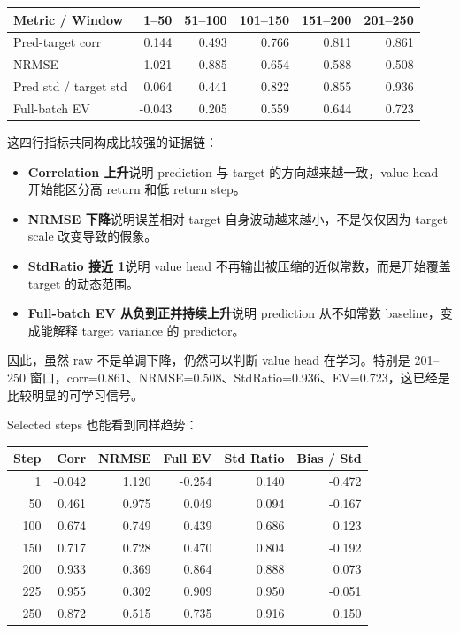\documentclass[10pt]{ctexart}
\begin{document}
\begin{center}
\begin{tabular}{lrrrrr}
\toprule
Metric / Window & 1--50 & 51--100 & 101--150 & 151--200 & 201--250 \\
\midrule
Pred-target corr & 0.144 & 0.493 & 0.766 & 0.811 & 0.861 \\
NRMSE & 1.021 & 0.885 & 0.654 & 0.588 & 0.508 \\
Pred std / target std & 0.064 & 0.441 & 0.822 & 0.855 & 0.936 \\
Full-batch EV & -0.043 & 0.205 & 0.559 & 0.644 & 0.723 \\
\bottomrule
\end{tabular}
\end{center}

这四行指标共同构成比较强的证据链：
\begin{itemize}
  \item \textbf{Correlation 上升}说明 prediction 与 target 的方向越来越一致，value head 开始能区分高 return 和低 return step。
  \item \textbf{NRMSE 下降}说明误差相对 target 自身波动越来越小，不是仅仅因为 target scale 改变导致的假象。
  \item \textbf{StdRatio 接近 1}说明 value head 不再输出被压缩的近似常数，而是开始覆盖 target 的动态范围。
  \item \textbf{Full-batch EV 从负到正并持续上升}说明 prediction 从不如常数 baseline，变成能解释 target variance 的 predictor。
\end{itemize}

因此，虽然 raw  不是单调下降，仍然可以判断 value head 在学习。特别是 201--250 窗口，corr=0.861、NRMSE=0.508、StdRatio=0.936、EV=0.723，这已经是比较明显的可学习信号。

Selected steps 也能看到同样趋势：
\begin{center}
\begin{tabular}{rrrrrr}
\toprule
Step & Corr & NRMSE & Full EV & Std Ratio & Bias / Std \\
\midrule
1 & -0.042 & 1.120 & -0.254 & 0.140 & -0.472 \\
50 & 0.461 & 0.975 & 0.049 & 0.094 & -0.167 \\
100 & 0.674 & 0.749 & 0.439 & 0.686 & 0.123 \\
150 & 0.717 & 0.728 & 0.470 & 0.804 & -0.192 \\
200 & 0.933 & 0.369 & 0.864 & 0.888 & 0.073 \\
225 & 0.955 & 0.302 & 0.909 & 0.950 & -0.051 \\
250 & 0.872 & 0.515 & 0.735 & 0.916 & 0.150 \\
\bottomrule
\end{tabular}
\end{center}
\end{document}
